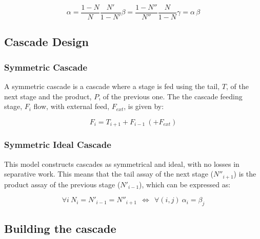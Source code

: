 \begin{subequations}
    \label{eq_alphabeta}
    \begin{equation} \label{eq_alpha_def}
        \alpha = \frac{1-N}{N}\frac{N'}{1-N'}
    \end{equation}
    \begin{equation}\label{eq_beta-def}
        \beta = \frac{1-N''}{N''}\frac{N}{1-N}
    \end{equation}
    \begin{equation}\label{eq_gamma-def}
        \gamma = \alpha \, \beta
    \end{equation}
\end{subequations}


\subsection{Cascade Design}
\subsubsection{Symmetric Cascade}

A symmetric cascade is a cascade where a stage is fed using the tail, $T$, of the next stage and the product, $P$, of the previous one. The the cascade feeding stage, $F_{i}$ flow, with external feed, $F_{ext}$, is given by:

\begin{equation}
    F_{i} = T_{i+1} + F_{i-1} ~(+ F_{ext})
\end{equation}

\subsubsection{Symmetric Ideal Cascade}
This model constructs cascades as symmetrical and ideal, with no losses in
separative work. This means that the tail assay of the next stage ($N''_{i+1}$)
is the product assay of the previous stage ($N'_{i-1}$), which can be
expressed as:

\begin{equation}
    \forall i~ N_{i} = N'_{i-1} = N''_{i+1}~ ~\Leftrightarrow~ ~\forall (i,j)~
    \alpha_{i} = \beta_{j}
\end{equation}



\subsection{Building the cascade}

